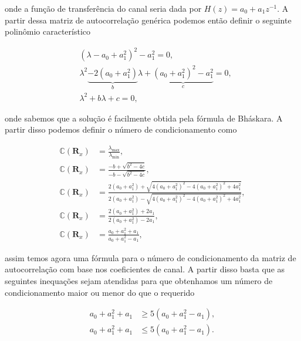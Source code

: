 \documentclass[a4paper,10pt]{article}
\begin{document}
\begin{enumerate}
\begin{enumerate}
						onde a função de transferência do canal seria dada por $H(z) = a_{0} + a_{1}z^{-1}$. A partir dessa matriz de autocorrelação genérica podemos então 
						definir o seguinte polinômio característico

						\begin{align}
							&(\lambda - a_{0} + a^{2}_{1})^{2} - a^{2}_{1} = 0, \\
							&\lambda^{2} \underbrace{- 2 (a_{0} + a^{2}_{1})}_{b} \lambda + \underbrace{(a_{0} + a^{2}_{1})^{2} - a^{2}_{1}}_{c} = 0, \\
							&\lambda^{2} + b \lambda + c = 0,
						\end{align}

						onde sabemos que a solução é facilmente obtida pela fórmula de Bháskara. A partir disso podemos definir o número de condicionamento como

						\begin{align}
							\mathbb{C} (\mathbf{R}_{x}) &= \frac{\lambda_{\text{max}}}{\lambda_{\text{min}}}, \\
							\mathbb{C} (\mathbf{R}_{x}) &= \frac{- b + \sqrt{b^{2} - 4c}}{- b - \sqrt{b^{2} - 4c}}, \\
							\mathbb{C} (\mathbf{R}_{x}) &= \frac{2 (a_{0} + a^{2}_{1}) + \sqrt{4 (a_{0} + a^{2}_{1})^{2} - 4 (a_{0} + a^{2}_{1})^{2} + 4 a^{2}_{1}}}{2 (a_{0} + a^{2}_{1}) - \sqrt{4 (a_{0} + a^{2}_{1})^{2} - 4 (a_{0} + a^{2}_{1})^{2} + 4 a^{2}_{1}}}, \\
							\mathbb{C} (\mathbf{R}_{x}) &= \frac{2 (a_{0} + a^{2}_{1}) + 2a_{1}}{2 (a_{0} + a^{2}_{1}) - 2a_{1}}, \\
							\mathbb{C} (\mathbf{R}_{x}) &= \frac{a_{0} + a^{2}_{1} + a_{1}}{a_{0} + a^{2}_{1} - a_{1}},
						\end{align}

						assim temos agora uma fórmula para o número de condicionamento da matriz de autocorrelação com base nos coeﬁcientes de canal. A partir disso basta que as seguintes inequações sejam atendidas para que
						obtenhamos um número de condicionamento maior ou menor do que o requerido

						\begin{align}
							a_{0} + a^{2}_{1} + a_{1} &\geq 5 (a_{0} + a^{2}_{1} - a_{1}), \\
							a_{0} + a^{2}_{1} + a_{1} &\leq 5 (a_{0} + a^{2}_{1} - a_{1}).
						\end{align}

				\end{enumerate}
			

\end{enumerate}
\end{document}
